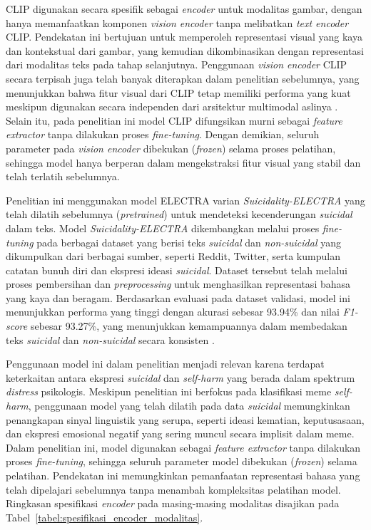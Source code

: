 CLIP digunakan secara spesifik sebagai \textit{encoder} untuk modalitas gambar, dengan hanya memanfaatkan komponen \textit{vision encoder} tanpa melibatkan \textit{text encoder} CLIP. Pendekatan ini bertujuan untuk memperoleh representasi visual yang kaya dan kontekstual dari gambar, yang kemudian dikombinasikan dengan representasi dari modalitas teks pada tahap selanjutnya. Penggunaan \textit{vision encoder} CLIP secara terpisah juga telah banyak diterapkan dalam penelitian sebelumnya, yang menunjukkan bahwa fitur visual dari CLIP tetap memiliki performa yang kuat meskipun digunakan secara independen dari arsitektur multimodal aslinya \cite{gao2021clipadapter}. Selain itu, pada penelitian ini model CLIP difungsikan murni sebagai \textit{feature extractor} tanpa dilakukan proses \textit{fine-tuning}. Dengan demikian, seluruh parameter pada \textit{vision encoder} dibekukan (\textit{frozen}) selama proses pelatihan, sehingga model hanya berperan dalam mengekstraksi fitur visual yang stabil dan telah terlatih sebelumnya.

Penelitian ini menggunakan model ELECTRA varian \textit{Suicidality-ELECTRA} yang telah dilatih sebelumnya (\textit{pretrained}) untuk mendeteksi kecenderungan \textit{suicidal} dalam teks. Model \textit{Suicidality-ELECTRA} dikembangkan melalui proses \textit{fine-tuning} pada berbagai dataset yang berisi teks \textit{suicidal} dan \textit{non-suicidal} yang dikumpulkan dari berbagai sumber, seperti Reddit, Twitter, serta kumpulan catatan bunuh diri dan ekspresi ideasi \textit{suicidal}. Dataset tersebut telah melalui proses pembersihan dan \textit{preprocessing} untuk menghasilkan representasi bahasa yang kaya dan beragam.  Berdasarkan evaluasi pada dataset validasi, model ini menunjukkan performa yang tinggi dengan akurasi sebesar 93.94\% dan nilai \textit{F1-score} sebesar 93.27\%, yang menunjukkan kemampuannya dalam membedakan teks \textit{suicidal} dan \textit{non-suicidal} secara konsisten \cite{Dus2022SuicidalElectra}.

Penggunaan model ini dalam penelitian menjadi relevan karena terdapat keterkaitan antara ekspresi \textit{suicidal} dan \textit{self-harm} yang berada dalam spektrum \textit{distress} psikologis. Meskipun penelitian ini berfokus pada klasifikasi meme \textit{self-harm}, penggunaan model yang telah dilatih pada data \textit{suicidal} memungkinkan penangkapan sinyal linguistik yang serupa, seperti ideasi kematian, keputusasaan, dan ekspresi emosional negatif yang sering muncul secara implisit dalam meme. Dalam penelitian ini, model digunakan sebagai \textit{feature extractor} tanpa dilakukan proses \textit{fine-tuning}, sehingga seluruh parameter model dibekukan (\textit{frozen}) selama pelatihan. Pendekatan ini memungkinkan pemanfaatan representasi bahasa yang telah dipelajari sebelumnya tanpa menambah kompleksitas pelatihan model. Ringkasan spesifikasi \textit{encoder} pada masing-masing modalitas disajikan pada Tabel~\ref{tabel:spesifikasi_encoder_modalitas}.

